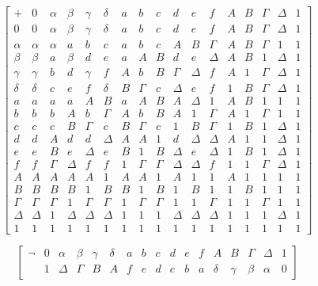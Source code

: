\documentclass[
]{article}
\begin{document}
\begin{enumerate}
  \[\begin{bmatrix}
   + & 0 & \alpha & \beta & \gamma & \delta & a & b & c & d & e & f & Α & Β & \Gamma & \Delta & 1 \\
  0 & 0 & \alpha & \beta & \gamma & \delta & a & b & c & d & e & f & Α & Β & \Gamma & \Delta & 1 \\
  \alpha & \alpha & \alpha & a & b & c & a & b & c & Α & Β & \Gamma & Α & Β & \Gamma & 1 & 1 \\
  \beta & \beta & a & \beta & d & e & a & Α & Β & d & e & \Delta & Α & Β & 1 & \Delta & 1 \\
  \gamma & \gamma & b & d & \gamma & f & Α & b & Β & \Gamma & \Delta & f & Α & 1 & \Gamma & \Delta & 1 \\
  \delta & \delta & c & e & f & \delta & Β & \Gamma & c & \Delta & e & f & 1 & Β & \Gamma & \Delta & 1 \\
  a & a & a & a & Α & Β & a & Α & Β & Α & \Delta & 1 & Α & Β & 1 & 1 & 1 \\
  b & b & b & Α & b & \Gamma & Α & b & Β & Α & 1 & \Gamma & Α & 1 & \Gamma & 1 & 1 \\
  c & c & c & Β & \Gamma & c & Β & \Gamma & c & 1 & Β & \Gamma & 1 & Β & 1 & \Delta & 1 \\
  d & d & Α & d & d & \Delta & Α & Α & 1 & d & \Delta & \Delta & Α & 1 & 1 & \Delta & 1 \\
  e & e & Β & e & \Delta & e & Β & 1 & Β & \Delta & e & \Delta & 1 & Β & 1 & \Delta & 1 \\
  f & f & \Gamma & \Delta & f & f & 1 & \Gamma & \Gamma & \Delta & \Delta & f & 1 & 1 & \Gamma & \Delta & 1 \\
  Α & Α & Α & Α & Α & 1 & Α & Α & 1 & Α & 1 & 1 & Α & 1 & 1 & 1 & 1 \\
  Β & Β & Β & Β & 1 & Β & Β & 1 & Β & 1 & Β & 1 & 1 & Β & 1 & 1 & 1 \\
  \Gamma & \Gamma & \Gamma & 1 & \Gamma & \Gamma & 1 & \Gamma & \Gamma & 1 & 1 & \Gamma & 1 & 1 & \Gamma & 1 & 1 \\
  \Delta & \Delta & 1 & \Delta & \Delta & \Delta & 1 & 1 & 1 & \Delta & \Delta & \Delta & 1 & 1 & 1 & \Delta & 1 \\
  1 & 1 & 1 & 1 & 1 & 1 & 1 & 1 & 1 & 1 & 1 & 1 & 1 & 1 & 1 & 1 & 1
  \end{bmatrix}\]
\end{enumerate}

\[\begin{bmatrix}
\neg & 0 & \alpha & \beta & \gamma & \delta & a & b & c & d & e & f & Α & Β & \Gamma & \Delta & 1 \\
 & 1 & \Delta & \Gamma & Β & Α & f & e & d & c & b & a & \delta & \gamma & \beta & \alpha & 0
\end{bmatrix}\]
\end{document}
